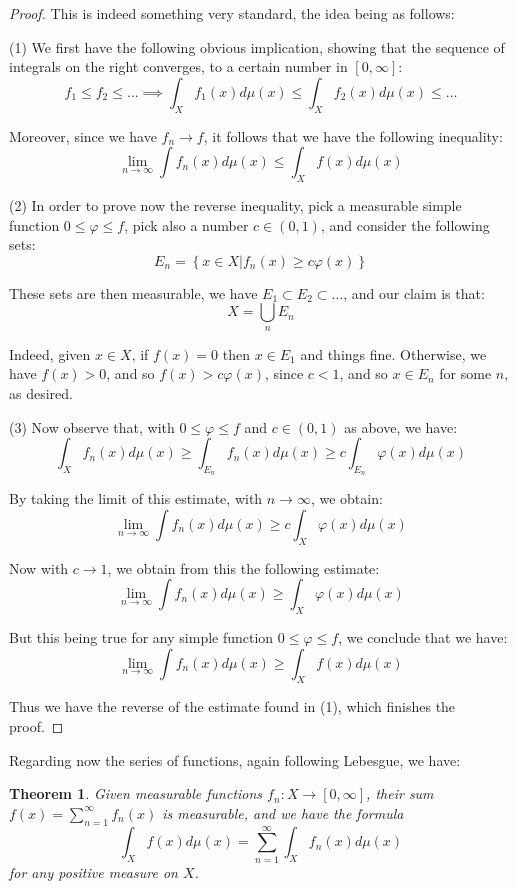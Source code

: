 \documentclass[12pt]{amsbook}
\newtheorem{theorem}{Theorem}[chapter]
\begin{document}
\begin{proof}
This is indeed something very standard, the idea being as follows:

\medskip

(1) We first have the following obvious implication, showing that the sequence of integrals on the right converges, to a certain number in $[0,\infty]$: 
$$f_1\leq f_2\leq\ldots\implies\int_Xf_1(x)d\mu(x)\leq\int_Xf_2(x)d\mu(x)\leq\ldots$$

Moreover, since we have $f_n\to f$, it follows that we have the following inequality:
$$\lim_{n\to\infty}\int f_n(x)d\mu(x)\leq\int_Xf(x)d\mu(x)$$

(2) In order to prove now the reverse inequality, pick a measurable simple function $0\leq\varphi\leq f$, pick also a number $c\in(0,1)$, and consider the following sets:
$$E_n=\left\{x\in X\Big|f_n(x)\geq c\varphi(x)\right\}$$

These sets are then measurable, we have $E_1\subset E_2\subset\ldots$, and our claim is that:
$$X=\bigcup_nE_n$$

Indeed, given $x\in X$, if $f(x)=0$ then $x\in E_1$ and things fine. Otherwise, we have $f(x)>0$, and so $f(x)>c\varphi(x)$, since $c<1$, and so $x\in E_n$ for some $n$, as desired.

\medskip

(3) Now observe that, with $0\leq\varphi\leq f$ and $c\in(0,1)$ as above, we have:
$$\int_Xf_n(x)d\mu(x)\geq\int_{E_n}f_n(x)d\mu(x)\geq c\int_{E_n}\varphi(x)d\mu(x)$$

By taking the limit of this estimate, with $n\to\infty$, we obtain:
$$\lim_{n\to\infty}\int f_n(x)d\mu(x)\geq c\int_X\varphi(x)d\mu(x)$$

Now with $c\to1$, we obtain from this the following estimate:
$$\lim_{n\to\infty}\int f_n(x)d\mu(x)\geq\int_X\varphi(x)d\mu(x)$$

But this being true for any simple function $0\leq\varphi\leq f$, we conclude that we have:
$$\lim_{n\to\infty}\int f_n(x)d\mu(x)\geq\int_X f(x)d\mu(x)$$

Thus we have the reverse of the estimate found in (1), which finishes the proof.
\end{proof}

Regarding now the series of functions, again following Lebesgue, we have:

\begin{theorem}
Given measurable functions $f_n:X\to[0,\infty]$, their sum $f(x)=\sum_{n=1}^\infty f_n(x)$
is measurable, and we have the formula
$$\int_Xf(x)d\mu(x)=\sum_{n=1}^\infty\int_Xf_n(x)d\mu(x)$$
for any positive measure on $X$.
\end{theorem}
\end{document}
